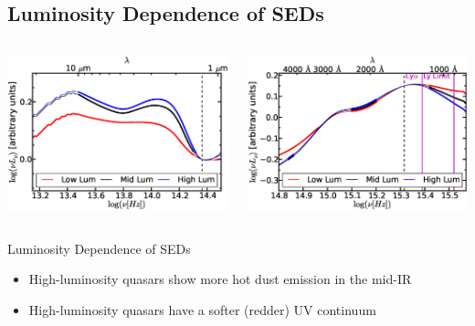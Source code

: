 \documentclass[landscape,9pt]{beamer}
\begin{document}
\subsection{Luminosity Dependence of SEDs}
\begin{frame}	
	\begin{columns}
		\begin{column}{0.55\textwidth}
			\includegraphics[width=\textwidth]{../images/SEDs/f13a}
		\end{column}
		\begin{column}{0.55\textwidth}
			\includegraphics[width=\textwidth]{../images/SEDs/f13b}
		\end{column}
	\end{columns}
	\begin{block}{Luminosity Dependence of SEDs}
		\begin{itemize}
			\item High-luminosity quasars show more hot dust emission in the mid-IR
			\item High-luminosity quasars have a softer (redder) UV continuum
		\end{itemize}
	\end{block}
\end{frame}
\end{document}
